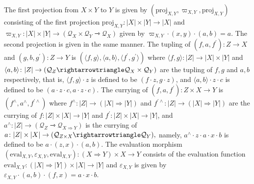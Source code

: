\documentclass[10pt,a4paper]{amsart}
\begin{document}
The first projection from $X\times Y$ to $Y$ is given by $(\mathrm{proj}_{X,Y},\varpi_{X,Y},\mathrm{proj}_{X,Y})$ consisting of the first projection $\mathrm{proj}_{X,Y}\colon|X|\times|Y|\to|X|$ and $\varpi_{X,Y}\colon|X|\times|Y|\to(\mathcal{Q}_{X}\times\mathcal{Q}_{Y}%
\rightarrowtriangle\mathcal{Q}_{X})$ given by $\varpi_{X,Y}\cdot(x,y)\cdot(a,b)=a$. The second projection is given in the same manner. The tupling of $(f,a,f^{\prime})\colon Z\to X$ and $(g,b,g^{\prime})\colon Z\to Y$ is $(\langle f,g\rangle,\langle a,b\rangle,\langle f^{\prime},g^{\prime}\rangle)$ where $\langle f,g\rangle\colon|Z|\to|X|\times|Y|$ and $\langle a,b\rangle\colon|Z|\to(\mathcal{Q}_{Z}\rightarrowtriangle\mathcal{Q}_{%
X}\times\mathcal{Q}_{Y})$ are the tupling of $f,g$ and $a,b$ respectively, that is, $\langle f,g\rangle\cdot z$ is defined to be $(f\cdot z,g\cdot z)$, and $\langle a,b\rangle\cdot z\cdot c$ is defined to be $(a\cdot z\cdot c,a\cdot z\cdot c)$. The currying of $(f,a,f^{\prime})\colon Z\times X\to Y$ is $(f^{\wedge},a^{\wedge},f^{\prime\wedge})$ where $f^{\wedge}\colon|Z|\to(|X|\Rightarrow|Y|)$ and $f^{\prime\wedge}\colon|Z|\to(|X|\Rightarrow|Y|)$ are the currying of $f\colon|Z|\times|X|\to|Y|$ and $f^{\prime}\colon|Z|\times|X|\to|Y|$, and $a^{\wedge}\colon|Z|\to(\mathcal{Q}_{Z}\rightarrowtriangle\mathcal{Q}_{X%
\Rightarrow Y})$ is the currying of $a\colon|Z|\times|X|\to(\mathcal{Q}_{Z\times X}\rightarrowtriangle\mathcal{Q}_{%
Y}),$ namely, $a^{\wedge}\cdot z\cdot a\cdot x\cdot b$ is defined to be $a\cdot(z,x)\cdot(a,b)$. The evaluation morphism $(\mathrm{eval}_{X,Y},\varepsilon_{X,Y},\mathrm{eval}_{X,Y})\colon(X\Rightarrow
Y%
)\times X\to Y$ consists of the evaluation function $\mathrm{eval}_{X,Y}\colon(|X|\Rightarrow|Y|)\times|X|\to|Y|$ and $\varepsilon_{X,Y}$ is given by $\varepsilon_{X,Y}\cdot(a,b)\cdot(f,x)=a\cdot x\cdot b.$\par
 
 
\end{document}
